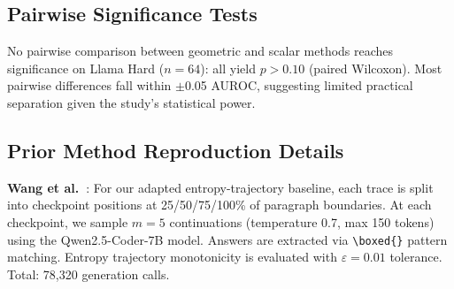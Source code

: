 \documentclass{article}
\begin{document}
\begin{table}[t]
\centering
\caption{Spectral and transition method results on hard BigMath (LOO, direction-agnostic).}
\label{tab:spectral}
\end{table}

\subsection{Pairwise Significance Tests}
\label{app:pairwise}

No pairwise comparison between geometric and scalar methods reaches significance on Llama Hard ($n{=}64$): all yield $p > 0.10$ (paired Wilcoxon). Most pairwise differences fall within $\pm$0.05 AUROC, suggesting limited practical separation given the study's statistical power.

\subsection{Prior Method Reproduction Details}
\label{app:repro}

\textbf{Wang et al.~\cite{wang2025eat}}: For our adapted entropy-trajectory baseline, each trace is split into checkpoint positions at 25/50/75/100\% of paragraph boundaries. At each checkpoint, we sample $m{=}5$ continuations (temperature 0.7, max 150 tokens) using the Qwen2.5-Coder-7B model. Answers are extracted via \texttt{\textbackslash boxed\{\}} pattern matching. Entropy trajectory monotonicity is evaluated with $\varepsilon{=}0.01$ tolerance. Total: 78,320 generation calls.
\end{document}
